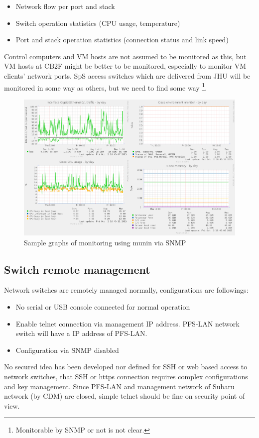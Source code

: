 \documentclass[a4paper,notitlepage]{article}
\begin{document}
\begin{itemize}
  \item Network flow per port and stack
  \item Switch operation statistics (CPU usage, temperature)
  \item Port and stack operation statistics (connection status and link speed)
\end{itemize}

Control computers and VM hosts are not assumed to be monitored as this, but 
VM hosts at CB2F might be better to be monitored, especially to monitor VM 
clients' network ports. 
SpS access switches which are delivered from JHU will be monitored in some way 
as others, but we need to find some way
\footnote{Monitorable by SNMP or not is not clear.}.

\begin{figure}[htb]
  \begin{center}
    \includegraphics{pfs_network_munin.png}
  \end{center}
  \caption{Sample graphs of monitoring using munin via SNMP}
  \label{fig:network_munin}
\end{figure}

\subsection{Switch remote management}

Network switches are remotely managed normally, configurations are followings: 

\begin{itemize}
  \item No serial or USB console connected for normal operation
  \item Enable telnet connection via management IP address. PFS-LAN network 
    switch will have a IP address of PFS-LAN.
  \item Configuration via SNMP disabled
\end{itemize}

No secured idea has been developed nor defined for SSH or web based access to 
network switches, that SSH or https connection requires complex configurations 
and key management. Since PFS-LAN and management network of Subaru network (by 
CDM) are closed, simple telnet should be fine on security point of view.
\end{document}
